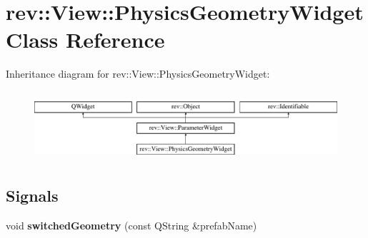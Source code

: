 \hypertarget{classrev_1_1_view_1_1_physics_geometry_widget}{}\section{rev\+::View\+::Physics\+Geometry\+Widget Class Reference}
\label{classrev_1_1_view_1_1_physics_geometry_widget}
Inheritance diagram for rev\+::View\+::Physics\+Geometry\+Widget\+:\begin{figure}[H]
\begin{center}
\leavevmode
\includegraphics[height=2.604651cm]{classrev_1_1_view_1_1_physics_geometry_widget}
\end{center}
\end{figure}
\subsection*{Signals}
\begin{DoxyCompactItemize}
\item 
\mbox{\label{classrev_1_1_view_1_1_physics_geometry_widget_a27fc98e6808ef6eee0ed21788f61b63a}} 
void {\bfseries switched\+Geometry} (const Q\+String \&prefab\+Name)
\end{DoxyCompactItemize}
